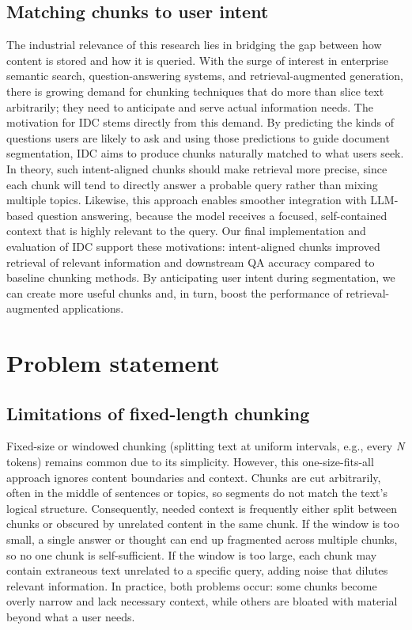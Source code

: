 \documentclass[12pt,a4paper]{report}
\begin{document}
\subsection{Matching chunks to user intent}
The industrial relevance of this research lies in bridging the gap between how content is stored and how it is queried. With the surge of interest in enterprise semantic search, question-answering systems, and retrieval-augmented generation, there is growing demand for chunking techniques that do more than slice text arbitrarily; they need to anticipate and serve actual information needs. The motivation for IDC stems directly from this demand. By predicting the kinds of questions users are likely to ask and using those predictions to guide document segmentation, IDC aims to produce chunks naturally matched to what users seek. In theory, such intent-aligned chunks should make retrieval more precise, since each chunk will tend to directly answer a probable query rather than mixing multiple topics. Likewise, this approach enables smoother integration with LLM-based question answering, because the model receives a focused, self-contained context that is highly relevant to the query. Our final implementation and evaluation of IDC support these motivations: intent-aligned chunks improved retrieval of relevant information and downstream QA accuracy compared to baseline chunking methods. By anticipating user intent during segmentation, we can create more useful chunks and, in turn, boost the performance of retrieval-augmented applications.

\section{Problem statement}

\subsection{Limitations of fixed-length chunking}
Fixed-size or windowed chunking (splitting text at uniform intervals, e.g., every \textit{N} tokens) remains common due to its simplicity. However, this one-size-fits-all approach ignores content boundaries and context. Chunks are cut arbitrarily, often in the middle of sentences or topics, so segments do not match the text's logical structure. Consequently, needed context is frequently either split between chunks or obscured by unrelated content in the same chunk. If the window is too small, a single answer or thought can end up fragmented across multiple chunks, so no one chunk is self-sufficient. If the window is too large, each chunk may contain extraneous text unrelated to a specific query, adding noise that dilutes relevant information. In practice, both problems occur: some chunks become overly narrow and lack necessary context, while others are bloated with material beyond what a user needs.
\end{document}
